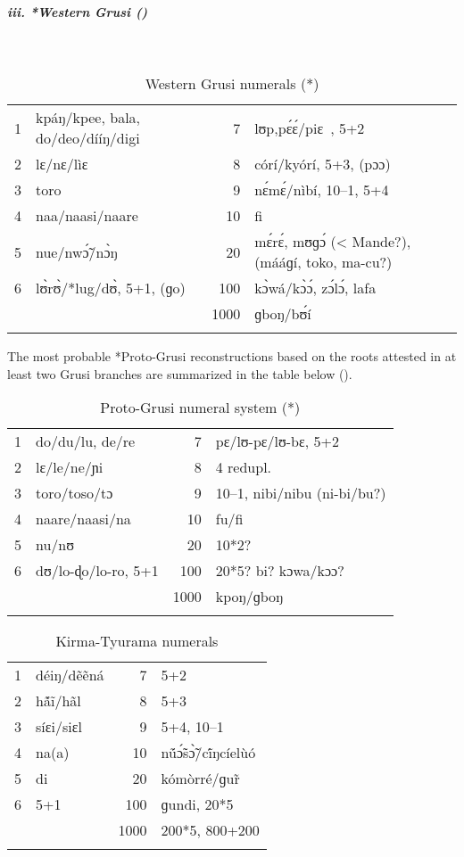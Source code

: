 \subparagraph{iii. *Western Grusi ()}
~
\begin{table}[h]
\caption{\label{tab:3:176}Western Grusi numerals (*)}
\begin{tabularx}{\textwidth}{llrQ}
\lsptoprule
{1} & kpáŋ/kpee, bala, do/deo/dííŋ/digi & {7} & lʊp,p{\'{ɛ}}{\'{ɛ}}/piɛ~, 5+2\\
{2} & lɛ/nɛ/lìɛ & {8} & córí/kyórí, 5+3, (pɔɔ)\\
{3} & toro & {9} & n{\'{ɛ}}m{\'{ɛ}}/nìbí, 10--1, 5+4\\
{4} & naa/naasi/naare & {10} & fi\\
{5} & nue/nw{\'{\~ɔ}}/n{\`{ɔ}}ŋ & {20} & m{\'{ɛ}}r{\'{ɛ}}, mʊɡ{\'{ɔ}} (< Mande?), (mááɡí, toko, ma-cu?)\\
{6} & l{\`{ʊ}}r{\`{ʊ}}/*lug/d{\`{ʊ}}, 5+1, (ɡo) & {100} & k{\`{ɔ}}wá/k{\`{ɔ}}{\'{ɔ}}, z{\'{ɔ}}l{\'{ɔ}}, lafa\\
&  & {1000} & ɡboŋ/b{\'{ʊ}}í\\
\lspbottomrule
\end{tabularx}
\end{table}

  
The most probable *Proto-Grusi reconstructions based on the roots attested in at least two Grusi branches are summarized in the table below ().

\begin{table}
\caption{\label{tab:3:177}Proto-Grusi numeral system (*)}
\begin{tabularx}{\textwidth}{lXrl}
\lsptoprule
{1} & do/du/lu, de/re & {7} & pɛ/lʊ-pɛ/lʊ-bɛ, 5+2\\
{2} & lɛ/le/ne/ɲi & {8} & 4 redupl.\\
{3} & toro/toso/tɔ & {9} & 10--1, nibi/nibu (ni-bi/bu?)\\
{4} & naare/naasi/na & {10} & fu/fi\\
{5} & nu/nʊ & {20} & 10*2?\\
{6} & dʊ/lo-ɖo/lo-ro, 5+1 & {100} & 20*5? bi? kɔwa/kɔɔ?\\
&  & {1000} & kpoŋ/ɡboŋ\\
\lspbottomrule
\end{tabularx}
\end{table}

  
\begin{table}
\caption{\label{tab:3:178}Kirma-Tyurama numerals}
\begin{tabularx}{\textwidth}{lXrl}
\lsptoprule
{1} & déiŋ/d{\~{e}}{\~{e}}ná & {7} & 5+2\\
{2} & h{\'ã}{\~{i}}/h{\~{a}}l & {8} & 5+3\\
{3} & síɛi/siɛl & {9} & 5+4, 10--1\\
{4} & na(a) & {10} & n{\'ũ}{\'{\~ɔ}}s{\`{\~ɔ}}/c{\'ĩ}ŋcíel{\`{u}}ó\\
{5} & di & {20} & kómòrré/ɡu{\~{r}}\\
{6} & 5+1 & {100} & ɡundi, 20*5\\
&  & {1000} & 200*5, 800+200\\
\lspbottomrule
\end{tabularx}
\end{table}

